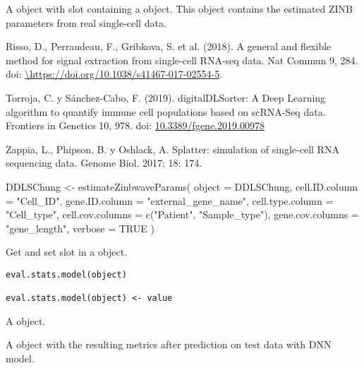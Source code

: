\documentclass[a4paper]{book}
\begin{document}
%
\begin{Value}
A  object with  slot
containing
a  object. This object contains the estimated ZINB
parameters from real single-cell data.
\end{Value}
%
\begin{References}\relax
Risso, D., Perraudeau, F., Gribkova, S. et al. (2018). A general and flexible
method for signal extraction from single-cell RNA-seq data. Nat Commun 9,
284. doi: \url{\https://doi.org/10.1038/s41467-017-02554-5}.

Torroja, C. y Sánchez-Cabo, F. (2019). digitalDLSorter: A Deep Learning
algorithm to quantify immune cell populations based on scRNA-Seq data.
Frontiers in Genetics 10,
978. doi: \url{10.3389/fgene.2019.00978}

Zappia, L., Phipson, B. y Oshlack, A. Splatter: simulation of single-cell RNA
sequencing data. Genome Biol. 2017; 18: 174.
\end{References}
%
\begin{SeeAlso}\relax
{}
\end{SeeAlso}
%
\begin{Examples}
\begin{ExampleCode}
DDLSChung <- estimateZinbwaveParams(
  object = DDLSChung,
  cell.ID.column = "Cell_ID",
  gene.ID.column = "external_gene_name",
  cell.type.column = "Cell_type",
  cell.cov.columns = c("Patient", "Sample_type"),
  gene.cov.columns = "gene_length",
  verbose = TRUE
)

\end{ExampleCode}
\end{Examples}
%
\begin{Description}\relax
Get and set  slot in a
 object.
\end{Description}
%
\begin{Usage}
\begin{verbatim}
eval.stats.model(object)

eval.stats.model(object) <- value
\end{verbatim}
\end{Usage}
%
\begin{Arguments}
\begin{ldescription}
\item[\code{object}] A  object.

\item[\code{value}] A  object with the resulting metrics after prediction
on test data with DNN model.
\end{ldescription}
\end{Arguments}
\end{document}
